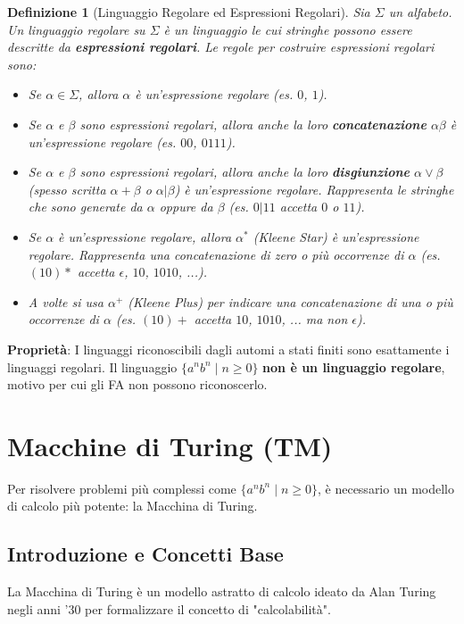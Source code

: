 \documentclass[a4paper]{article}
\newtheorem{definition}{Definizione}
\begin{document}
\begin{definition}[Linguaggio Regolare ed Espressioni Regolari]
    Sia $\Sigma$ un alfabeto. Un linguaggio regolare su $\Sigma$ è un linguaggio le cui stringhe possono essere descritte da \textbf{espressioni regolari}.
    Le regole per costruire espressioni regolari sono:
    \begin{itemize}
        \item Se $\alpha \in \Sigma$, allora $\alpha$ è un'espressione regolare (es. $0$, $1$).
        \item Se $\alpha$ e $\beta$ sono espressioni regolari, allora anche la loro \textbf{concatenazione} $\alpha\beta$ è un'espressione regolare (es. $00$, $0111$).
        \item Se $\alpha$ e $\beta$ sono espressioni regolari, allora anche la loro \textbf{disgiunzione} $\alpha \lor \beta$ (spesso scritta $\alpha + \beta$ o $\alpha | \beta$) è un'espressione regolare. Rappresenta le stringhe che sono generate da $\alpha$ oppure da $\beta$ (es. $0 | 11$ accetta $0$ o $11$).
        \item Se $\alpha$ è un'espressione regolare, allora $\alpha^*$ (Kleene Star) è un'espressione regolare. Rappresenta una concatenazione di zero o più occorrenze di $\alpha$ (es. $(10)*$ accetta $\epsilon$, $10$, $1010$, ...).
        \item A volte si usa $\alpha^+$ (Kleene Plus) per indicare una concatenazione di una o più occorrenze di $\alpha$ (es. $(10)+$ accetta $10$, $1010$, ... ma non $\epsilon$).
    \end{itemize}
\end{definition}

\textbf{Proprietà}: I linguaggi riconoscibili dagli automi a stati finiti sono esattamente i linguaggi regolari. Il linguaggio $\{a^n b^n \mid n \ge 0\}$ \textbf{non è un linguaggio regolare}, motivo per cui gli FA non possono riconoscerlo.

\section{Macchine di Turing (TM)}
Per risolvere problemi più complessi come $\{a^n b^n \mid n \ge 0\}$, è necessario un modello di calcolo più potente: la Macchina di Turing.

\subsection{Introduzione e Concetti Base}
La Macchina di Turing è un modello astratto di calcolo ideato da Alan Turing negli anni '30 per formalizzare il concetto di "calcolabilità".
\end{document}
